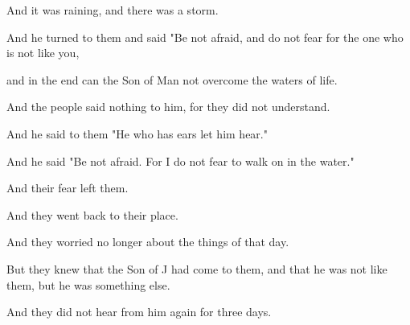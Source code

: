 \Sentence
{ \hX{} }
{ \eX{} }
{
And it was raining, and there was a storm.
}

\Sentence
{ \hX{} }
{ \eX{} }
{
And he turned to them and said "Be not afraid, and do not fear for the one who is not like you,
}

\Sentence
{ \hX{} }
{ \eX{} }
{
and in the end can the Son of Man not overcome the waters of life.
}

\Sentence
{ \hX{} }
{ \eX{} }
{
And the people said nothing to him, for they did not understand.
}

\Sentence
{ \hX{} }
{ \eX{} }
{
And he said to them "He who has ears let him hear."
}

\Sentence
{ \hX{} }
{ \eX{} }
{
And he said "Be not afraid. For I do not fear to walk on in the water."
}

\Sentence
{ \hX{} }
{ \eX{} }
{
And their fear left them.
}

\Sentence
{ \hX{} }
{ \eX{} }
{
And they went back to their place.
}

\Sentence
{ \hX{} }
{ \eX{} }
{
And they worried no longer about the things of that day.
}

\Sentence
{ \hX{} }
{ \eX{} }
{
But they knew that the Son of J had come to them, and that he was not like them, but he was something else.
}

\Sentence
{ \hX{} }
{ \eX{} }
{
And they did not hear from him again for three days.
}
